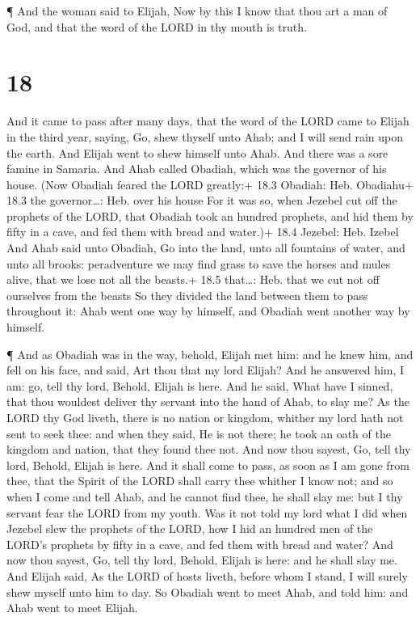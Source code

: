  ¶ And the woman said to Elijah, Now by this I know that
thou art a man of God, and that the word of the LORD in thy mouth is
truth.

\hypertarget{section-17}{%
\section{18}\label{section-17}}

 And it came to pass after many days, that the word of the
LORD came to Elijah in the third year, saying, Go, shew thyself unto
Ahab; and I will send rain upon the earth.  And Elijah went
to shew himself unto Ahab. And there was a sore famine in Samaria.
 And Ahab called Obadiah, which was the governor of his
house. (Now Obadiah feared the LORD greatly:+ 18.3 Obadiah: Heb.
Obadiahu+ 18.3 the governor\ldots: Heb. over his house  For
it was so, when Jezebel cut off the prophets of the LORD, that Obadiah
took an hundred prophets, and hid them by fifty in a cave, and fed them
with bread and water.)+ 18.4 Jezebel: Heb. Izebel  And Ahab
said unto Obadiah, Go into the land, unto all fountains of water, and
unto all brooks: peradventure we may find grass to save the horses and
mules alive, that we lose not all the beasts.+ 18.5 that\ldots: Heb.
that we cut not off ourselves from the beasts  So they
divided the land between them to pass throughout it: Ahab went one way
by himself, and Obadiah went another way by himself.

 ¶ And as Obadiah was in the way, behold, Elijah met him:
and he knew him, and fell on his face, and said, Art thou that my lord
Elijah?  And he answered him, I am: go, tell thy lord,
Behold, Elijah is here.  And he said, What have I sinned,
that thou wouldest deliver thy servant into the hand of Ahab, to slay
me?  As the LORD thy God liveth, there is no nation or
kingdom, whither my lord hath not sent to seek thee: and when they said,
He is not there; he took an oath of the kingdom and nation, that they
found thee not.  And now thou sayest, Go, tell thy lord,
Behold, Elijah is here.  And it shall come to pass, as soon
as I am gone from thee, that the Spirit of the LORD shall carry thee
whither I know not; and so when I come and tell Ahab, and he cannot find
thee, he shall slay me: but I thy servant fear the LORD from my youth.
 Was it not told my lord what I did when Jezebel slew the
prophets of the LORD, how I hid an hundred men of the LORD's prophets by
fifty in a cave, and fed them with bread and water?  And
now thou sayest, Go, tell thy lord, Behold, Elijah is here: and he shall
slay me.  And Elijah said, As the LORD of hosts liveth,
before whom I stand, I will surely shew myself unto him to day.
 So Obadiah went to meet Ahab, and told him: and Ahab went
to meet Elijah.

